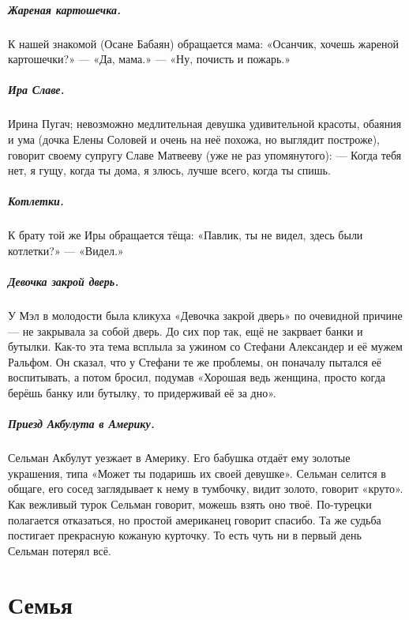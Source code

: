 \documentclass{book}
\begin{document}
\paragraph{Жареная картошечка.}
К нашей знакомой (Осане Бабаян) обращается мама:
«Осанчик, хочешь жареной картошечки?» --- «Да, мама.» --- «Ну, почисть и пожарь.»

\paragraph{Ира Славе.}
Ирина Пугач; невозможно медлительная девушка удивительной красоты, обаяния и ума (дочка Елены Соловей и очень на неё похожа, но выглядит построже), говорит своему супругу Славе Матвееву (уже не раз упомянутого):
--- Когда тебя нет, я гущу, когда ты дома, я злюсь, лучше всего, когда ты спишь.

\paragraph{Котлетки.}
К брату той же Иры обращается тёща:
«Павлик, ты не видел, здесь были котлетки?» --- «Видел.»

\paragraph{Девочка закрой дверь.}
У Мэл в молодости была кликуха «Девочка закрой дверь» по очевидной причине --- не закрывала за собой дверь.
До сих пор так, ещё не закрвает банки и бутылки.
Как-то эта тема всплыла за ужином со Стефани Александер и её мужем Ральфом.
Он сказал, что у Стефани те же проблемы, он поначалу пытался её воспитывать, а потом бросил, подумав «Хорошая ведь женщина, просто когда берёшь банку или бутылку, то придерживай её за дно».

\paragraph{Приезд Акбулута в Америку.}
Сельман Акбулут уезжает в Америку.
Его бабушка отдаёт ему золотые украшения, типа «Может ты подаришь их своей девушке».
Сельман селится в общаге, его сосед заглядывает к нему в тумбочку, видит золото, говорит «круто».
Как вежливый турок Сельман говорит, можешь взять оно твоё.
По-турецки полагается отказаться, но простой американец говорит спасибо.
Та же судьба постигает прекрасную кожаную курточку.
То есть чуть ни в первый день Сельман потерял всё.



\chapter*{Семья}
\end{document}
